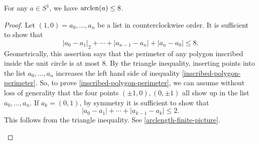 \begin{lemma} \label{arclength-finite}
	For any $a \in S^1$, we have $\mathrm{arclen}(a) \leq 8$. 
\end{lemma}

\begin{proof}
	Let $(1, 0) = a_0, \dotsc, a_n$ be a list in counterclockwise order. It is sufficient to show that 
	\begin{equation} \label{inscribed-polygon-perimeter} |a_0 - a_1|_2 + \dotsb + |a_{n-1} - a_n| + |a_n - a_0| \leq 8. \end{equation}
	Geometrically, this assertion says that the perimeter of any polygon inscribed inside the unit circle is at most 8. By the triangle inequality, inserting points into the list $a_0, \dotsc, a_n$ increases the left hand side of inequality \ref{inscribed-polygon-perimeter}. So, to prove \cref{inscribed-polygon-perimeter}, we can assume without loss of generality that the four points $(\pm 1, 0), (0, \pm 1)$ all show up in the list $a_0, \dotsc, a_n$. If $a_k = (0,1)$, by symmetry it is sufficient to show that 
	\[ |a_0 - a_1| + \dotsb + |a_{k-1} - a_k| \leq 2. \]
	This follows from the triangle inequality. See \cref{arclength-finite-picture}. 
	\begin{figure}[ht]
		\begin{center}
\end{center}
\end{figure}
\end{proof}
